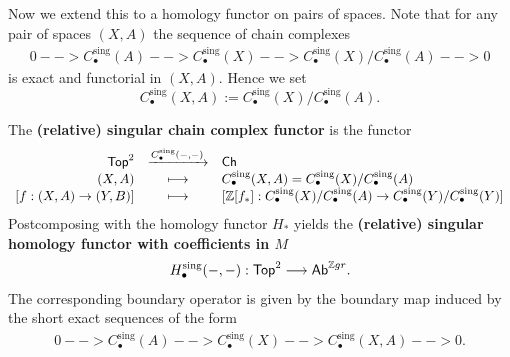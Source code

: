 	Now we extend this to a homology functor on pairs of spaces. Note that for any pair of spaces $(X,A)$ the sequence of chain complexes
	\begin{align*}
		0 --> C_\bullet^\text{sing}(A) --> C_\bullet^\text{sing}(X) --> C_\bullet^\text{sing}(X)/C_\bullet^\text{sing}(A) --> 0
	\end{align*}
	is exact and functorial in $(X,A)$. Hence we set
	\begin{equation*}
		C_\bullet^\text{sing}(X,A) := C_\bullet^\text{sing}(X)/C_\bullet^\text{sing}(A).
	\end{equation*}

	\begin{definition}
		The \textbf{(relative) singular chain complex functor} is the functor
		\begin{equation*}
			\begin{array}{rcl}
				\textsf{Top}^2 & \xrightarrow{C_\bullet^\text{sing}(-,-)} & \textsf{Ch}\\
				(X,A) & \longmapsto & C_\bullet^\text{sing}(X,A) = C_\bullet^\text{sing}(X)/C_\bullet^\text{sing}(A)\\
				{[f:(X,A)\rightarrow(Y,B)]} & \longmapsto & {[\mathbb{Z}[f_{*}]:C_\bullet^\text{sing}(X)/C_\bullet^\text{sing}(A) \rightarrow C_\bullet^\text{sing}(Y) / C_\bullet^\text{sing}(Y)]}
			\end{array}
		\end{equation*}
		Postcomposing with the homology functor $H_{*}$ yields the \textbf{(relative) singular homology functor with coefficients in $M$}
		\begin{align*}
			H_\bullet^\text{sing}(-,-): \textsf{Top}^2 --> \textsf{Ab}^{\mathbb{Z} gr}.
		\end{align*}
		The corresponding boundary operator is given by the boundary map induced by the short exact sequences of the form
		\begin{align*}
			0 --> C_\bullet^\text{sing}(A) --> C_\bullet^\text{sing}(X) --> C_\bullet^\text{sing}(X,A) --> 0.
		\end{align*}
	\end{definition}



